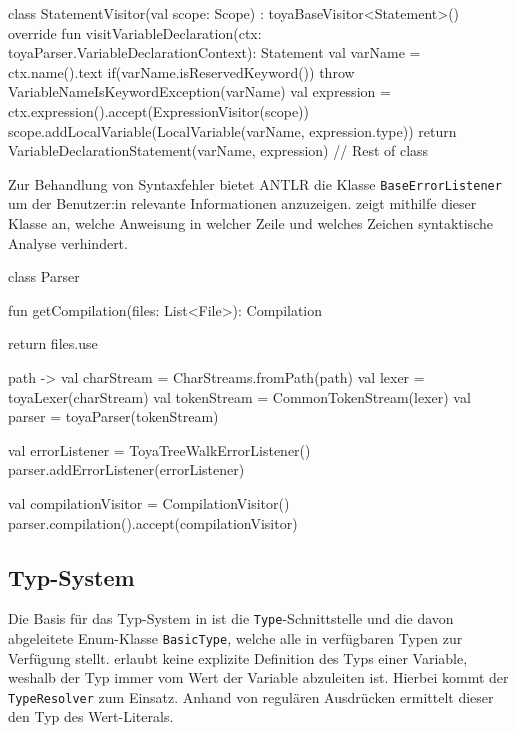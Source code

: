 \begin{KotlinCode}[numbers=none, caption={\visitor-Funktion zum Erstellen eines \texttt{VariableDeclarationStatement}}]
class StatementVisitor(val scope: Scope) : toyaBaseVisitor<Statement>() {
    override fun visitVariableDeclaration(ctx: toyaParser.VariableDeclarationContext): Statement {
        val varName = ctx.name().text
        if(varName.isReservedKeyword()) throw VariableNameIsKeywordException(varName)
        val expression = ctx.expression().accept(ExpressionVisitor(scope))
        scope.addLocalVariable(LocalVariable(varName, expression.type))
        return VariableDeclarationStatement(varName, expression)
    }
    // Rest of class
}
\end{KotlinCode}

Zur Behandlung von Syntaxfehler bietet ANTLR die Klasse \texttt{BaseErrorListener} um der Benutzer:in relevante Informationen anzuzeigen. \Toya zeigt mithilfe dieser Klasse an, welche Anweisung in welcher Zeile und welches Zeichen syntaktische Analyse verhindert.

\begin{KotlinCode}[numbers=none, caption={Erstellen des \visitor}]
class Parser {
    fun getCompilation(files: List<File>): Compilation {
        return files.use {path ->
            val charStream = CharStreams.fromPath(path)
            val lexer = toyaLexer(charStream)
            val tokenStream = CommonTokenStream(lexer)
            val parser = toyaParser(tokenStream)

            val errorListener = ToyaTreeWalkErrorListener()
            parser.addErrorListener(errorListener)

            val compilationVisitor = CompilationVisitor()
            parser.compilation().accept(compilationVisitor)
        }
    }
}
\end{KotlinCode}

\subsection{Typ-System}

Die Basis für das Typ-System in \toya ist die \texttt{Type}-Schnittstelle und die davon abgeleitete Enum-Klasse \texttt{BasicType}, welche alle in \toya verfügbaren Typen zur Verfügung stellt. \Toya erlaubt keine explizite Definition des Typs einer Variable, weshalb der Typ immer vom Wert der Variable abzuleiten ist. Hierbei kommt der \texttt{TypeResolver} zum Einsatz. Anhand von regulären Ausdrücken ermittelt dieser den Typ des Wert-Literals.

